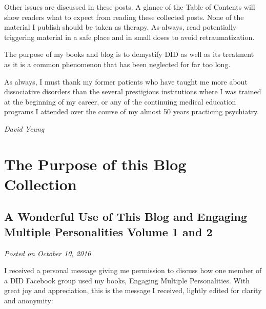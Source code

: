 \documentclass[]{book}
\begin{document}
Other issues are discussed in these posts. A glance of the Table of Contents will show readers what to expect from reading these collected posts. None of the material I publish should be taken as therapy. As always, read potentially triggering material in a safe place and in small doses to avoid retraumatization.

The purpose of my books and blog is to demystify DID as well as its treatment as it is a common phenomenon that has been neglected for far too long.

As always, I must thank my former patients who have taught me more about dissociative disorders than the several prestigious institutions where I was trained at the beginning of my career, or any of the continuing medical education programs I attended over the course of my almost 50 years practicing psychiatry.

\emph{David Yeung}

\hypertarget{the-purpose-of-this-blog-collection}{%
\chapter{The Purpose of this Blog Collection}\label{the-purpose-of-this-blog-collection}}

\hypertarget{a-wonderful-use-of-this-blog-and-engaging-multiple-personalities-volume-1-and-2}{%
\section{A Wonderful Use of This Blog and Engaging Multiple Personalities Volume 1 and 2}\label{a-wonderful-use-of-this-blog-and-engaging-multiple-personalities-volume-1-and-2}}

\emph{Posted on October 10, 2016}

I received a personal message giving me permission to discuss how one member of a DID Facebook group used my books, Engaging Multiple Personalities. With great joy and appreciation, this is the message I received, lightly edited for clarity and anonymity:
\end{document}
